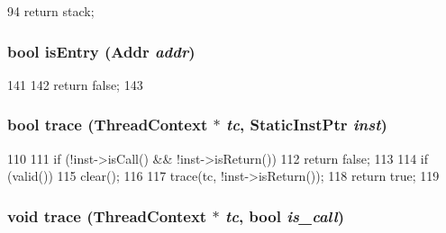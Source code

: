\begin{DoxyCode}
94 { return stack; }
\end{DoxyCode}
\hypertarget{classArmISA_1_1StackTrace_a8c9787d05f9c0e82dfcaf31cf0fd4b50}{
\subsubsection[{isEntry}]{\setlength{\rightskip}{0pt plus 5cm}bool isEntry ({\bf Addr} {\em addr})}}
\label{classArmISA_1_1StackTrace_a8c9787d05f9c0e82dfcaf31cf0fd4b50}



\begin{DoxyCode}
141     {
142         return false;
143     }
\end{DoxyCode}
\hypertarget{classArmISA_1_1StackTrace_aabb136846a5e22007e44db846652ddd5}{
\subsubsection[{trace}]{\setlength{\rightskip}{0pt plus 5cm}bool trace ({\bf ThreadContext} $\ast$ {\em tc}, \/  {\bf StaticInstPtr} {\em inst})}}
\label{classArmISA_1_1StackTrace_aabb136846a5e22007e44db846652ddd5}



\begin{DoxyCode}
110 {
111     if (!inst->isCall() && !inst->isReturn())
112         return false;
113 
114     if (valid())
115         clear();
116 
117     trace(tc, !inst->isReturn());
118     return true;
119 }
\end{DoxyCode}
\hypertarget{classArmISA_1_1StackTrace_a46d6b95a2e5fdb75702cf45e39566645}{
\subsubsection[{trace}]{\setlength{\rightskip}{0pt plus 5cm}void trace ({\bf ThreadContext} $\ast$ {\em tc}, \/  bool {\em is\_\-call})}}
\label{classArmISA_1_1StackTrace_a46d6b95a2e5fdb75702cf45e39566645}



